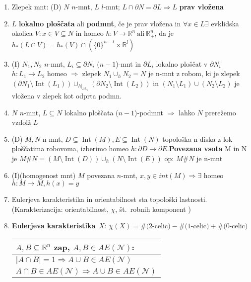 \documentclass[10pt,a4paper]{article}
\DeclareMathOperator{\Int}{Int}
\begin{document}
\begin{enumerate}

\item Zlepek mnt: (D) $N$ $n$-mnt, $L$ $l$-mnt; $L \cap \partial N = \partial L \Rightarrow L$ \textbf{prav vložena} 
\item $L$ \textbf{lokalno ploščata} ali \textbf{podmnt}, če je prav vložena in $\forall x \in L \exists$ evklidska okolica
    $V: x \in V \subseteq N$ in homeo $h: V \rightarrow \mathbb{R}^n~\text{ali}~\mathbb{R}^{n}_+$, da je $h_\ast(L\cap V) = h_\ast(V) \cap (\{0\}^{n-l}\times \mathbb{R}^l)$
\item (I) $N_1, N_2$ $n$-mnt, $L_i \subseteq \partial N_i$ ($n-1$)-mnt in $\partial L_i$ lokalno ploščat v $\partial N_i$ 
    \quad $h: L_1 \rightarrow L_2$ homeo $\Rightarrow$ zlepek $N_1 \cup_h N_2 = N$
    je n-mnt z robom, ki je zlepek $(\partial N_1 \setminus \Int(L_1)) \cup_{h|_{\partial L_1}} (\partial N_2 \setminus \Int(L_2))$ in $(N_1 \setminus L_1) \cup (N_2 \setminus L_2)$ je vložena v zlepek kot odprta podmn.
\item $N$ $n$-mnt, $L \subseteq N$ lokalno ploščata ($n-1$)-podmnt $\Rightarrow$ lahko $N$ prerežemo vzdolž $L$ 
\item (D) $M,N$ n-mnt, $D \subseteq \Int(M), E \subseteq \Int(N)$
topološka n-diska z lok ploščatima robovoma, izberimo homeo $h: \partial D \rightarrow \partial E$.\textbf{Povezana vsota} M in N je $M \# N = (M \setminus \Int(D)) \cup_h (N \setminus \Int(E))$ op: $M \# N$ je n-mnt
   
\item (I)(homogenost mnt) $M$ povezana $n$-mnt, $x, y \in int(M) \Rightarrow \exists$ homeo $h: M \rightarrow M, h(x)=y$

\vspace{-2mm}
\noindent\makebox[\linewidth]{\rule{\paperwidth}{0.4pt}} 
\vspace{-6mm}

\item Eulerjeva karakteristika in orientabilnost sta topološki lastnosti. (Karakterizacija: orientabilnost, 
$\chi$, 
št.~robnih komponent )
    
\item \textbf{Eulerjeva karakteristika}~$X$: $\chi(X) = \text{\#($2$-celic)} - \text{\#($1$-celic)} + \text{\#($0$-celic)}$


\vspace{1mm}
    \begin{tabular}{l}
        $A, B \subseteq\mathbb{R}^n$ zap, $A, B \in AE(\mathcal{N})$: \\ \hline
        $|A \cap B| = 1 \Rightarrow A \cup B \in AE(\mathcal{N})$ \\
        $A \cap B \in AE(\mathcal{N})\Rightarrow A \cup B \in AE(\mathcal{N})$ 
        

\end{tabular}
\end{enumerate}
\end{document}
